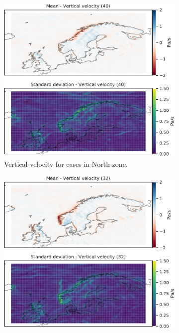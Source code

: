 \begin{figure}[H]
\begin{subfigure}[b]{0.49\textwidth}
    \centering
    \includegraphics[width=\textwidth]{Figures/WNord.pdf}
    \caption{Vertical velocity for cases in North zone.}
    \label{fig:NordW}
\end{subfigure}
\begin{subfigure}[b]{0.49\textwidth}
    \centering
    \includegraphics[width=\textwidth]{Figures/WNordvest.pdf}

\end{subfigure}
\end{figure}
